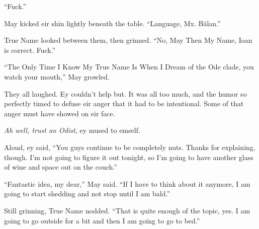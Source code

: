 ``Fuck.''

May kicked eir shin lightly beneath the table. ``Language, Mx. Bălan.''

True Name looked between them, then grinned. ``No, May Then My Name, Ioan is correct. Fuck.''

``The Only Time I Know My True Name Is When I Dream of the Ode clade, you watch your mouth,'' May growled.

They all laughed. Ey couldn't help but. It was all too much, and the humor so perfectly timed to defuse eir anger that it had to be intentional. Some of that anger must have showed on eir face.

\emph{Ah well, trust an Odist,} ey mused to emself.

Aloud, ey said, ``You guys continue to be completely nuts. Thanks for explaining, though. I'm not going to figure it out tonight, so I'm going to have another glass of wine and space out on the couch.''

``Fantastic idea, my dear,'' May said. ``If I have to think about it anymore, I am going to start shedding and not stop until I am bald.''

Still grinning, True Name nodded. ``That is quite enough of the topic, yes. I am going to go outside for a bit and then I am going to go to bed.''
